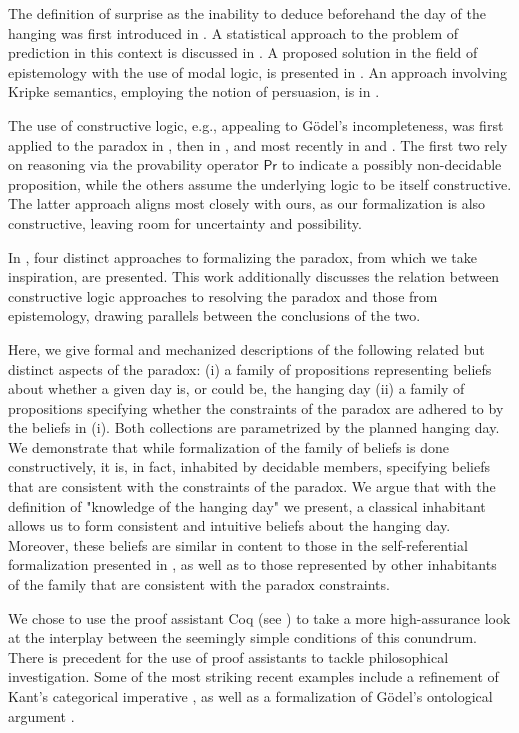 \documentclass[runningheads]{llncs}
\begin{document}
The definition of surprise as the inability to deduce beforehand the day of the hanging
was first introduced in \cite{prediction}. A statistical approach to the problem
of prediction in this context is discussed in \cite{statistical}.
A proposed solution in the field of epistemology with the use of modal
logic, is presented in \cite{modalepistemic}. An approach involving
Kripke semantics, employing the notion of persuasion, is in \cite{kripkemodal}.

The use of constructive logic,
e.g., appealing to G\"{o}del's incompleteness, was first applied to the
paradox in \cite{goedelized}, then in \cite{godelinconsistent}, and most recently
in \cite{constructive} and \cite{nonpredet}. The first two rely on reasoning via the provability operator $\mathsf{Pr}$ to indicate
a possibly non-decidable proposition, while the others assume the underlying logic to be itself
constructive. The latter approach aligns most closely with ours, as our formalization
is also constructive, leaving room for uncertainty and possibility.

In \cite{fourpossible}, four distinct approaches to formalizing the
paradox, from which we take inspiration, are presented. This work additionally discusses the relation between
constructive logic approaches to resolving the paradox and those from epistemology, drawing parallels
between the conclusions of the two.

Here, we give formal and mechanized descriptions of the following
related but distinct aspects of the
paradox: (i) a family of propositions
representing beliefs about whether a given day is, or could be, the hanging day
(ii) a family of propositions specifying whether the constraints of the
paradox are adhered to by the beliefs in (i). Both collections are parametrized by
the planned hanging day. We demonstrate that while formalization of the
family of beliefs is done constructively, it is, in fact,
inhabited by decidable members, specifying beliefs that are consistent with the constraints of the paradox. We argue that
with the definition of "knowledge of the hanging day" we present,
a classical inhabitant allows us
to form consistent and intuitive beliefs about the hanging day.
Moreover, these beliefs are similar in content to those in the self-referential formalization presented
in \cite{godelinconsistent}, as well as to those represented by other inhabitants
of the family that are consistent with the paradox constraints.

We chose to use the proof
assistant Coq (see \cite{coqmanual}) to take a more high-assurance look at the
interplay between the seemingly simple conditions of this conundrum.
There is precedent for the use of proof assistants to tackle philosophical
investigation. Some of the most striking recent examples
include a refinement of Kant's categorical imperative \cite{categoricalkant},
as well as a formalization of G\"{o}del's ontological argument \cite{ontological}.
\end{document}
